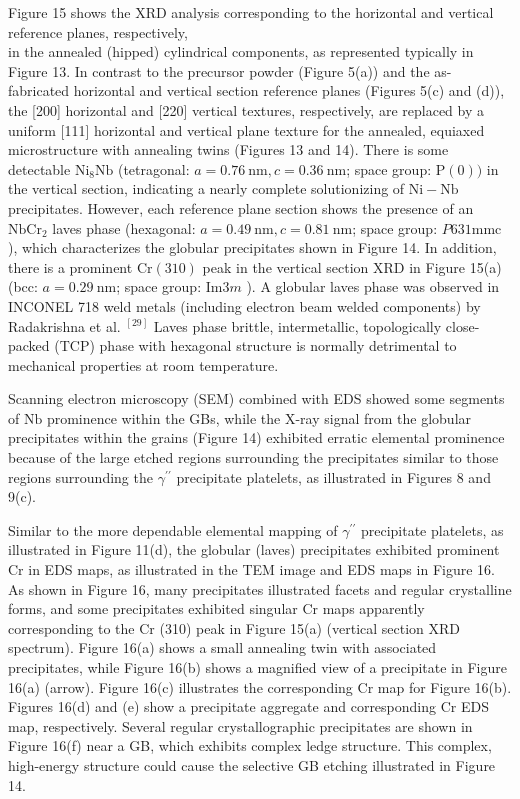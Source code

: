 \documentclass[10pt]{article}
\begin{document}
Figure 15 shows the XRD analysis corresponding to the horizontal and vertical reference planes, respectively,\\
in the annealed (hipped) cylindrical components, as represented typically in Figure 13. In contrast to the precursor powder (Figure 5(a)) and the as-fabricated horizontal and vertical section reference planes (Figures 5(c) and (d)), the [200] horizontal and [220] vertical textures, respectively, are replaced by a uniform [111] horizontal and vertical plane texture for the annealed, equiaxed microstructure with annealing twins (Figures 13 and 14). There is some detectable $\mathrm{Ni}_{8} \mathrm{Nb}$ (tetragonal: $a=0.76 \mathrm{~nm}, c=0.36 \mathrm{~nm}$; space group: $\mathrm{P}(0))$ in the vertical section, indicating a nearly complete solutionizing of $\mathrm{Ni}-\mathrm{Nb}$ precipitates. However, each reference plane section shows the presence of an $\mathrm{NbCr}_{2}$ laves phase (hexagonal: $a=0.49 \mathrm{~nm}, c=0.81 \mathrm{~nm}$; space group: $P 631 \mathrm{mmc}$ ), which characterizes the globular precipitates shown in Figure 14. In addition, there is a prominent $\mathrm{Cr}(310)$ peak in the vertical section XRD in Figure 15(a) (bcc: $a=0.29 \mathrm{~nm}$; space group: Im$3 m$ ). A globular laves phase was observed in INCONEL 718 weld metals (including electron beam welded components) by Radakrishna et al. ${ }^{[29]}$ Laves phase brittle, intermetallic, topologically close-packed (TCP) phase with hexagonal structure is normally detrimental to mechanical properties at room temperature.

Scanning electron microscopy (SEM) combined with EDS showed some segments of $\mathrm{Nb}$ prominence within the GBs, while the X-ray signal from the globular precipitates within the grains (Figure 14) exhibited erratic elemental prominence because of the large etched regions surrounding the precipitates similar to those regions surrounding the $\gamma^{\prime \prime}$ precipitate platelets, as illustrated in Figures 8 and 9(c).

Similar to the more dependable elemental mapping of $\gamma^{\prime \prime}$ precipitate platelets, as illustrated in Figure 11(d), the globular (laves) precipitates exhibited prominent $\mathrm{Cr}$ in EDS maps, as illustrated in the TEM image and EDS maps in Figure 16. As shown in Figure 16, many precipitates illustrated facets and regular crystalline forms, and some precipitates exhibited singular $\mathrm{Cr}$ maps apparently corresponding to the $\mathrm{Cr}$ (310) peak in Figure 15(a) (vertical section XRD spectrum). Figure 16(a) shows a small annealing twin with associated precipitates, while Figure 16(b) shows a magnified view of a precipitate in Figure 16(a) (arrow). Figure 16(c) illustrates the corresponding $\mathrm{Cr}$ map for Figure 16(b). Figures 16(d) and (e) show a precipitate aggregate and corresponding Cr EDS map, respectively. Several regular crystallographic precipitates are shown in Figure 16(f) near a GB, which exhibits complex ledge structure. This complex, high-energy structure could cause the selective GB etching illustrated in Figure 14.
\end{document}
